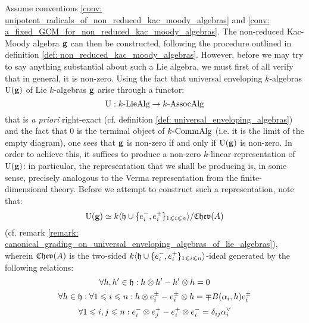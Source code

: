             \begin{remark} \label{remark: non_reduced_kac_modoy_algebras_are_non_zero}
                Assume conventions \ref{conv: unipotent_radicals_of_non_reduced_kac_moody_algebras} and \ref{conv: a_fixed_GCM_for_non_reduced_kac_moody_algebras}. The non-reduced Kac-Moody algebra $\mathbf{g}$ can then be constructed, following the procedure outlined in definition \ref{def: non_reduced_kac_moody_algebras}. However, before we may try to say anything substantial about such a Lie algebra, we must first of all verify that in general, it is non-zero. Using the fact that universal enveloping $k$-algebras $\mathrm{U}(\mathbf{g})$ of Lie $k$-algebras $\mathbf{g}$ arise through a functor:
                    $$\mathrm{U}: k\text{-}\mathrm{Lie}\mathrm{Alg} \to k\text{-}\mathrm{Assoc}\mathrm{Alg}$$
                that is \textit{a priori} right-exact (cf. definition \ref{def: universal_enveloping_algebras}) and the fact that $0$ is the terminal object of $k\text{-}\mathrm{Comm}\mathrm{Alg}$ (i.e. it is the limit of the empty diagram), one sees that $\mathbf{g}$ is non-zero if and only if $\mathrm{U}(\mathbf{g})$ is non-zero. In order to achieve this, it suffices to produce a non-zero $k$-linear representation of $\mathrm{U}(\mathbf{g})$: in particular, the representation that we shall be producing is, in some sense, precisely analogous to the Verma representation from the finite-dimensional theory. Before we attempt to construct such a representation, note that:
                    $$\mathrm{U}(\mathbf{g}) \simeq k\langle\mathfrak{h} \cup \{e_i^-, e_i^+\}_{1 \leqslant i \leqslant n}\rangle/\mathfrak{Chev}(A)$$
                (cf. remark \ref{remark: canonical_grading_on_universal_enveloping_algebras_of_lie_algebras}), wherein $\mathfrak{Chev}(A)$ is the two-sided $k\langle\mathfrak{h} \cup \{e_i^-, e_i^+\}_{1 \leqslant i \leqslant n}\rangle$-ideal generated by the following relations:
                    $$\forall h, h' \in \h: h \tensor h' - h' \tensor h = 0$$
                    $$\forall h \in \h: \forall 1 \leq i \leq n: h \tensor e_i^{\pm} - e_i^{\pm} \tensor h = \mp B(\alpha_i, h) e_i^{\pm}$$
                    $$\forall 1 \leq i, j \leq n: e_i^- \tensor e_j^+ - e_i^+ \tensor e_i^- = \delta_{ij} \alpha_i^{\vee}$$
                

\end{remark}
